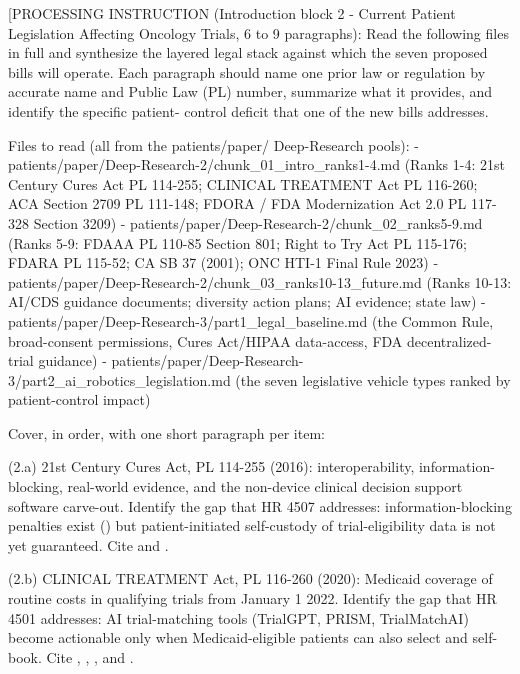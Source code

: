 [PROCESSING INSTRUCTION (Introduction block 2 - Current Patient
Legislation Affecting Oncology Trials, 6 to 9 paragraphs): Read the
following files in full and synthesize the layered legal stack against
which the seven proposed bills will operate. Each paragraph should
name one prior law or regulation by accurate name and Public Law (PL)
number, summarize what it provides, and identify the specific patient-
control deficit that one of the new bills addresses.

Files to read (all from the patients/paper/ Deep-Research pools):
- patients/paper/Deep-Research-2/chunk\_01\_intro\_ranks1-4.md (Ranks 1-4:
  21st Century Cures Act PL 114-255; CLINICAL TREATMENT Act PL 116-260;
  ACA Section 2709 PL 111-148; FDORA / FDA Modernization Act 2.0 PL
  117-328 Section 3209)
- patients/paper/Deep-Research-2/chunk\_02\_ranks5-9.md (Ranks 5-9: FDAAA
  PL 110-85 Section 801; Right to Try Act PL 115-176; FDARA PL 115-52;
  CA SB 37 (2001); ONC HTI-1 Final Rule 2023)
- patients/paper/Deep-Research-2/chunk\_03\_ranks10-13\_future.md
  (Ranks 10-13: AI/CDS guidance documents; diversity action plans;
  AI evidence; state law)
- patients/paper/Deep-Research-3/part1\_legal\_baseline.md (the
  Common Rule, broad-consent permissions, Cures Act/HIPAA data-access,
  FDA decentralized-trial guidance)
- patients/paper/Deep-Research-3/part2\_ai\_robotics\_legislation.md
  (the seven legislative vehicle types ranked by patient-control
  impact)

Cover, in order, with one short paragraph per item:

(2.a) 21st Century Cures Act, PL 114-255 (2016): interoperability,
information-blocking, real-world evidence, and the non-device clinical
decision support software carve-out. Identify the gap that HR 4507
addresses: information-blocking penalties exist
(\cite{federal_register_info_blocking_disincentives_2024}) but
patient-initiated self-custody of trial-eligibility data is not yet
guaranteed. Cite \cite{rank1_cures_act_2016} and
\cite{onc_cures_act_final_rule_page}.

(2.b) CLINICAL TREATMENT Act, PL 116-260 (2020): Medicaid coverage of
routine costs in qualifying trials from January 1 2022. Identify the
gap that HR 4501 addresses: AI trial-matching tools (TrialGPT, PRISM,
TrialMatchAI) become actionable only when Medicaid-eligible patients
can also select and self-book. Cite
\cite{rank2_clinical_treatment_act_2020}, \cite{jin2024trialgpt},
\cite{gupta2024prism}, and \cite{abdallah2026trialmatchai}.

